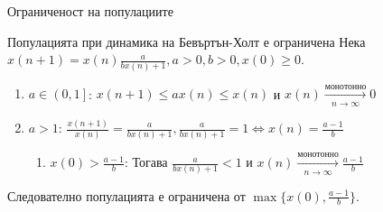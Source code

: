 
\begin{frame}[t]{Ограниченост на популациите}

  \begin{block}{Популацията при динамика на Бевъртън-Холт е ограничена}
    Нека $x(n+1)=x(n)\frac{a}{b x(n) + 1}, a > 0, b > 0,x(0) \geq 0$. \\
    \begin{enumerate}[I]

      \item $a \in \left(0, 1 \right]$: $x(n+1) \leq a x(n) \leq x(n)$ и $x(n) \xrightarrow[n \to \infty]{\text{монотонно}} 0$

      \item $a > 1$: $\frac{x(n+1)}{x(n)}=\frac{a}{b x(n) + 1}, \frac{a}{b x(n) + 1} = 1 \iff x(n) = \frac{a-1}{b}$
      \begin{enumerate}

          

          \item $x(0) > \frac{a-1}{b}$: Тогава $\frac{a}{b x(n) + 1} < 1$ и $x(n) \xrightarrow[n \to \infty]{\text{монотонно}} \frac{a-1}{b}$

        \end{enumerate}

    \end{enumerate}

    Следователно популацията е ограничена от $\max \{x(0), \frac{a-1}{b}\}$.


  \end{block}

\end{frame}

